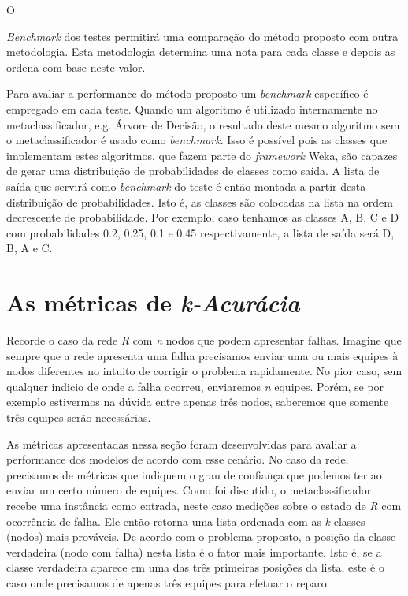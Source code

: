O {\textit{Benchmark} dos testes permitirá uma comparação do método proposto com outra metodologia.
Esta metodologia determina uma nota para cada classe e depois as ordena com base neste valor.

Para avaliar a performance do método proposto um \textit{benchmark} específico é empregado em cada teste.
Quando um algoritmo é utilizado internamente no metaclassificador, e.g. Árvore de Decisão, o resultado deste mesmo algoritmo sem o metaclassificador é usado como \textit{benchmark}.
Isso é possível pois as classes que implementam estes algoritmos, que fazem parte do \textit{framework} Weka, são capazes de gerar uma distribuição de probabilidades de classes como saída.
A lista de saída que servirá como \textit{benchmark} do teste é então montada a partir desta distribuição de probabilidades.
Isto é, as classes são colocadas na lista na ordem decrescente de probabilidade.
Por exemplo, caso tenhamos as classes A, B, C e D com probabilidades 0.2, 0.25, 0.1 e 0.45 respectivamente, a lista de saída será D, B, A e C.

\section{As métricas de \textit{k-Acurácia}}

Recorde o caso da rede \textit{R} com \textit{n} nodos que podem apresentar falhas.
Imagine que sempre que a rede apresenta uma falha precisamos enviar uma ou mais equipes à nodos diferentes no intuito de corrigir o problema rapidamente.
No pior caso, sem qualquer indicio de onde a falha ocorreu, enviaremos \textit{n} equipes.
Porém, se por exemplo estivermos na dúvida entre apenas três nodos, saberemos que somente três equipes serão necessárias.

As métricas apresentadas nessa seção foram desenvolvidas para avaliar a performance dos modelos de acordo com esse cenário.
No caso da rede, precisamos de métricas que indiquem o grau de confiança que podemos ter ao enviar um certo número de equipes.
Como foi discutido, o metaclassificador recebe uma instância como entrada, neste caso medições sobre o estado de \textit{R} com ocorrência de falha.
Ele então retorna uma lista ordenada com as \textit{k} classes (nodos) mais prováveis.
De acordo com o problema proposto, a posição da classe verdadeira (nodo com falha) nesta lista é o fator mais importante.
Isto é, se a classe verdadeira aparece em uma das três primeiras posições da lista, este é o caso onde precisamos de apenas três equipes para efetuar o reparo.

}
